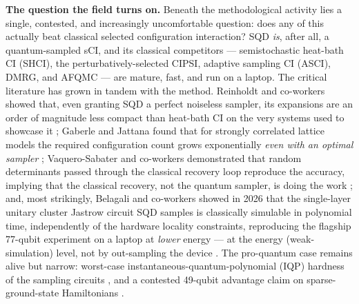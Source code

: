 \documentclass[onecolumn,a4paper]{quantumarticle}
\begin{document}
\textbf{The question the field turns on.} Beneath the methodological activity lies a single, contested, and increasingly uncomfortable question: does any of this actually beat classical selected configuration interaction? SQD \emph{is}, after all, a quantum-sampled sCI, and its classical competitors --- semistochastic heat-bath CI (SHCI), the perturbatively-selected CIPSI, adaptive sampling CI (ASCI), DMRG, and AFQMC --- are mature, fast, and run on a laptop. The critical literature has grown in tandem with the method. Reinholdt and co-workers showed that, even granting SQD a perfect noiseless sampler, its expansions are an order of magnitude less compact than heat-bath CI on the very systems used to showcase it \cite{reinholdt2025}; Gaberle and Jattana found that for strongly correlated lattice models the required configuration count grows exponentially \emph{even with an optimal sampler} \cite{gaberle2026}; Vaquero-Sabater and co-workers demonstrated that random determinants passed through the classical recovery loop reproduce the accuracy, implying that the classical recovery, not the quantum sampler, is doing the work \cite{vaquerosabater2026}; and, most strikingly, Belagali and co-workers showed in 2026 that the single-layer unitary cluster Jastrow circuit SQD samples is classically simulable in polynomial time, independently of the hardware locality constraints, reproducing the flagship 77-qubit experiment on a laptop at \emph{lower} energy --- at the energy (weak-simulation) level, not by out-sampling the device \cite{belagali2026}. The pro-quantum case remains alive but narrow: worst-case instantaneous-quantum-polynomial (IQP) hardness of the sampling circuits \cite{hafid2025}, and a contested 49-qubit advantage claim on sparse-ground-state Hamiltonians \cite{kirby2026}.
\end{document}
